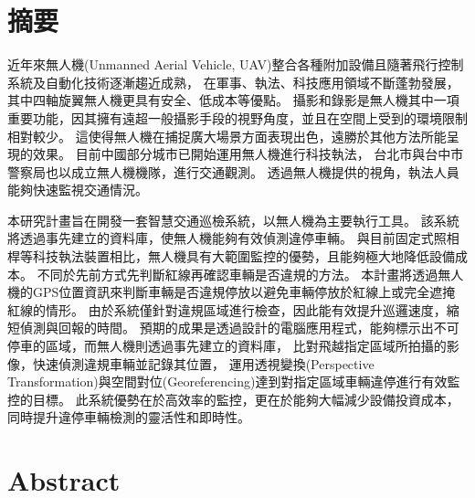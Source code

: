 \documentclass[12pt]{article}       %
\begin{document}
\setcounter{page}{1}  %


\section*{\centering 摘要}  %


\hspace{2em}
近年來無人機(Unmanned Aerial Vehicle, UAV)整合各種附加設備且隨著飛行控制系統及自動化技術逐漸趨近成熟，
在軍事、執法、科技應用領域不斷蓬勃發展，其中四軸旋翼無人機更具有安全、低成本等優點。
攝影和錄影是無人機其中一項重要功能，因其擁有遠超一般攝影手段的視野角度，並且在空間上受到的環境限制相對較少。
這使得無人機在捕捉廣大場景方面表現出色，遠勝於其他方法所能呈現的效果。
目前中國部分城市已開始運用無人機進行科技執法\cite{chinatimes2019}，
台北市與台中市警察局也以成立無人機機隊\cite{cna_2022}\cite{tai_2021}，進行交通觀測。
透過無人機提供的視角，執法人員能夠快速監視交通情況。

本研究計畫旨在開發一套智慧交通巡檢系統，以無人機為主要執行工具。
該系統將透過事先建立的資料庫，使無人機能夠有效偵測違停車輛。
與目前固定式照相桿等科技執法裝置相比，無人機具有大範圍監控的優勢，且能夠極大地降低設備成本。
不同於先前方式先判斷紅線再確認車輛是否違規的方法。
本計畫將透過無人機的GPS位置資訊來判斷車輛是否違規停放以避免車輛停放於紅線上或完全遮掩紅線的情形。
由於系統僅針對違規區域進行檢查，因此能有效提升巡邏速度，縮短偵測與回報的時間。
預期的成果是透過設計的電腦應用程式，能夠標示出不可停車的區域，而無人機則透過事先建立的資料庫，
比對飛越指定區域所拍攝的影像，快速偵測違規車輛並記錄其位置，
運用透視變換(Perspective Transformation)與空間對位(Georeferencing)達到對指定區域車輛違停進行有效監控的目標。
此系統優勢在於高效率的監控，更在於能夠大幅減少設備投資成本，同時提升違停車輛檢測的靈活性和即時性。

\newpage  %

\section*{\centering Abstract}  %
\end{document}
